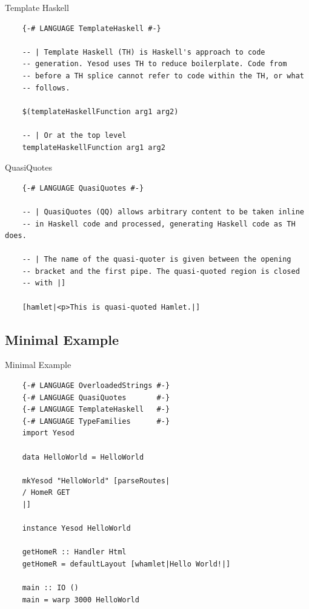 \documentclass[pdf]{beamer}
\begin{document}
\begin{frame}[fragile]{Template Haskell}
  \begin{verbatim}
    {-# LANGUAGE TemplateHaskell #-}
    
    -- | Template Haskell (TH) is Haskell's approach to code
    -- generation. Yesod uses TH to reduce boilerplate. Code from
    -- before a TH splice cannot refer to code within the TH, or what
    -- follows.

    $(templateHaskellFunction arg1 arg2)

    -- | Or at the top level
    templateHaskellFunction arg1 arg2
  \end{verbatim}
\end{frame}

\begin{frame}[fragile]{QuasiQuotes}
  \begin{verbatim}
    {-# LANGUAGE QuasiQuotes #-}
    
    -- | QuasiQuotes (QQ) allows arbitrary content to be taken inline
    -- in Haskell code and processed, generating Haskell code as TH does.

    -- | The name of the quasi-quoter is given between the opening
    -- bracket and the first pipe. The quasi-quoted region is closed
    -- with |]

    [hamlet|<p>This is quasi-quoted Hamlet.|]
  \end{verbatim}
\end{frame}

\subsection{Minimal Example}
\begin{frame}[fragile]{Minimal Example}
  \begin{verbatim}
    {-# LANGUAGE OverloadedStrings #-}
    {-# LANGUAGE QuasiQuotes       #-}
    {-# LANGUAGE TemplateHaskell   #-}
    {-# LANGUAGE TypeFamilies      #-}
    import Yesod

    data HelloWorld = HelloWorld

    mkYesod "HelloWorld" [parseRoutes|
    / HomeR GET
    |]

    instance Yesod HelloWorld

    getHomeR :: Handler Html
    getHomeR = defaultLayout [whamlet|Hello World!|]

    main :: IO ()
    main = warp 3000 HelloWorld
  \end{verbatim}
\end{frame}
\end{document}
